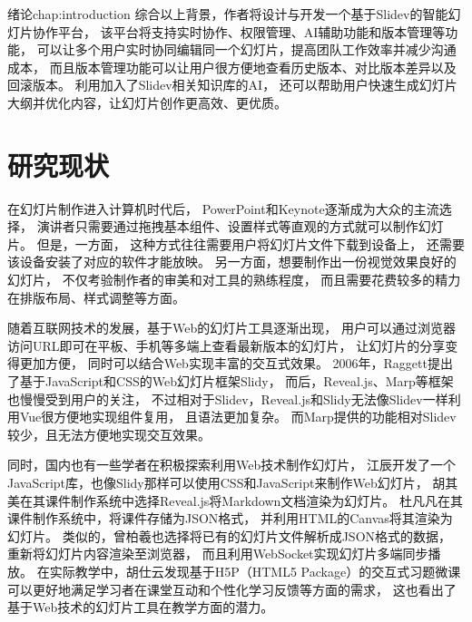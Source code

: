 \begin{cuzchapter}{绪论}{chap:introduction}
	综合以上背景，作者将设计与开发一个基于Slidev的智能幻灯片协作平台，
	该平台将支持实时协作、权限管理、AI辅助功能和版本管理等功能，
	可以让多个用户实时协同编辑同一个幻灯片，提高团队工作效率并减少沟通成本，
	而且版本管理功能可以让用户很方便地查看历史版本、对比版本差异以及回滚版本。
	利用加入了Slidev相关知识库的AI，
	还可以帮助用户快速生成幻灯片大纲并优化内容，让幻灯片创作更高效、更优质。

	\section{研究现状}\label{sec:history}

	在幻灯片制作进入计算机时代后，
	PowerPoint和Keynote逐渐成为大众的主流选择，
	演讲者只需要通过拖拽基本组件、设置样式等直观的方式就可以制作幻灯片。
	但是，一方面，
	这种方式往往需要用户将幻灯片文件下载到设备上，	
	还需要该设备安装了对应的软件才能放映。
	另一方面，想要制作出一份视觉效果良好的幻灯片，
	不仅考验制作者的审美和对工具的熟练程度，
	而且需要花费较多的精力在排版布局、样式调整等方面。
	
	随着互联网技术的发展，基于Web的幻灯片工具逐渐出现，
	用户可以通过浏览器访问URL即可在平板、手机等多端上查看最新版本的幻灯片，
	让幻灯片的分享变得更加方便，
	同时可以结合Web实现丰富的交互式效果。
	2006年，Raggett提出了基于JavaScript和CSS的Web幻灯片框架Slidy\cite{raggett2006slidywebppt}，
	而后，Reveal.js、Marp等框架也慢慢受到用户的关注，
	不过相对于Slidev，Reveal.js和Slidy无法像Slidev一样利用Vue很方便地实现组件复用，
	且语法更加复杂。
	而Marp提供的功能相对Slidev较少，且无法方便地实现交互效果。
	

	同时，国内也有一些学者在积极探索利用Web技术制作幻灯片，
	江辰开发了一个JavaScript库，也像Slidy那样可以使用CSS和JavaScript来制作Web幻灯片\cite{JSJY2012S2039}，
	胡其美在其课件制作系统中选择Reveal.js将Markdown文档渲染为幻灯片\cite{1020353599.nh}。
	杜凡凡在其课件制作系统中，将课件存储为JSON格式，
	并利用HTML的Canvas将其渲染为幻灯片\cite{1019253093.nh}。
	类似的，曾柏羲也选择将已有的幻灯片文件解析成JSON格式的数据，
	重新将幻灯片内容渲染至浏览器，
	而且利用WebSocket实现幻灯片多端同步播放\cite{1018807854.nh}。
	在实际教学中，胡仕云发现基于H5P（HTML5 Package）的交互式习题微课可以更好地满足学习者在课堂互动和个性化学习反馈等方面的需求\cite{1023445262.nh}，
	这也看出了基于Web技术的幻灯片工具在教学方面的潜力。
	

\end{cuzchapter}
